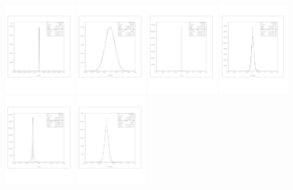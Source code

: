 \documentclass[a4paper]{article}
\begin{document}
\begin{figure}[!htb]
  \centering
  \includegraphics[width=0.23\textwidth]{ex_images/1_005_010_xslab.jpg}
  \includegraphics[width=0.23\textwidth]{ex_images/1_005_010_xslabesr.jpg}
  \includegraphics[width=0.23\textwidth]{ex_images/1_005_030_xslab.jpg}
  \includegraphics[width=0.23\textwidth]{ex_images/1_005_030_xse.jpg}
  \includegraphics[width=0.23\textwidth]{ex_images/1_005_050_xs.jpg}
  \includegraphics[width=0.23\textwidth]{ex_images/1_005_050_xse.jpg}

\end{figure}
\end{document}
